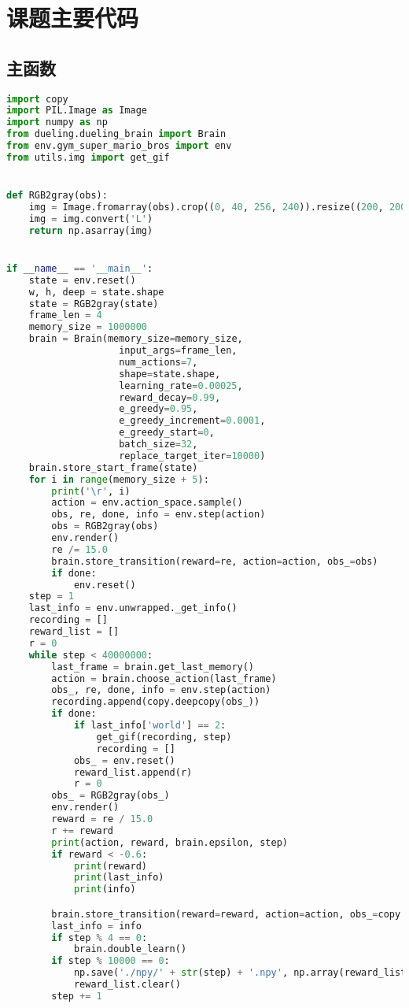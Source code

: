 \chapter{课题主要代码}
\section{主函数}
\begin{lstlisting}[language={python}]
import copy
import PIL.Image as Image
import numpy as np
from dueling.dueling_brain import Brain
from env.gym_super_mario_bros import env
from utils.img import get_gif


def RGB2gray(obs):
    img = Image.fromarray(obs).crop((0, 40, 256, 240)).resize((200, 200))
    img = img.convert('L')
    return np.asarray(img)


if __name__ == '__main__':
    state = env.reset()
    w, h, deep = state.shape
    state = RGB2gray(state)
    frame_len = 4
    memory_size = 1000000
    brain = Brain(memory_size=memory_size,
                    input_args=frame_len,
                    num_actions=7,
                    shape=state.shape,
                    learning_rate=0.00025,
                    reward_decay=0.99,
                    e_greedy=0.95,
                    e_greedy_increment=0.0001,
                    e_greedy_start=0,
                    batch_size=32,
                    replace_target_iter=10000)
    brain.store_start_frame(state)
    for i in range(memory_size + 5):
        print('\r', i)
        action = env.action_space.sample()
        obs, re, done, info = env.step(action)
        obs = RGB2gray(obs)
        env.render()
        re /= 15.0
        brain.store_transition(reward=re, action=action, obs_=obs)
        if done:
            env.reset()
    step = 1
    last_info = env.unwrapped._get_info()
    recording = []
    reward_list = []
    r = 0
    while step < 40000000:
        last_frame = brain.get_last_memory()
        action = brain.choose_action(last_frame)
        obs_, re, done, info = env.step(action)
        recording.append(copy.deepcopy(obs_))
        if done:
            if last_info['world'] == 2:
                get_gif(recording, step)
                recording = []
            obs_ = env.reset()
            reward_list.append(r)
            r = 0
        obs_ = RGB2gray(obs_)
        env.render()
        reward = re / 15.0
        r += reward
        print(action, reward, brain.epsilon, step)
        if reward < -0.6:
            print(reward)
            print(last_info)
            print(info)

        brain.store_transition(reward=reward, action=action, obs_=copy.deepcopy(obs_))
        last_info = info
        if step % 4 == 0:
            brain.double_learn()
        if step % 10000 == 0:
            np.save('./npy/' + str(step) + '.npy', np.array(reward_list))
            reward_list.clear()
        step += 1
\end{lstlisting}
